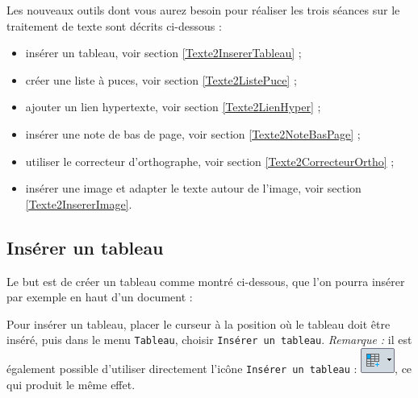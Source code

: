 
Les nouveaux outils dont vous aurez besoin pour réaliser les trois séances sur le traitement de texte sont décrits ci-dessous :


\begin{itemize}   
\item insérer un tableau, voir section \vref{Texte2InsererTableau} ;
\item créer une liste à puces, voir section \vref{Texte2ListePuce} ;
\item ajouter un lien hypertexte, voir section \vref{Texte2LienHyper} ;
\item insérer une note de bas de page, voir section \vref{Texte2NoteBasPage} ;
\item utiliser le correcteur d'orthographe, voir section \vref{Texte2CorrecteurOrtho} ;
\item insérer une image et adapter le texte autour de l'image, voir section \vref{Texte2InsererImage}.
\end{itemize}  



\subsection{Insérer un tableau}\label{Texte2InsererTableau} 



Le but est de créer un tableau comme montré ci-dessous, que l'on pourra insérer par exemple en haut d'un document :



Pour insérer un tableau, placer le curseur à la position où le tableau doit être inséré, puis dans le menu \texttt{Tableau}, choisir \texttt{Insérer un tableau}. \emph{Remarque :} il est également possible d'utiliser directement l'icône \texttt{Insérer un tableau} : \includegraphics[width=.6cm]{./images/texte02/InsererTableauIcone}, ce qui produit le même effet.

